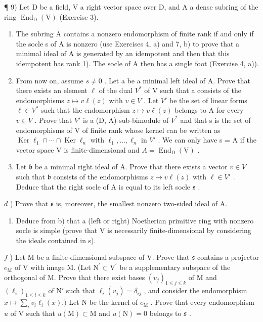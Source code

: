 ¶ 9) Let D be a field, V a right vector space over D, and A a dense subring of the ring \(\operatorname{End}_{\mathrm{D}}(\mathrm{V})\) (Exercise 3).

\begin{enumerate}
\def\labelenumi{\alph{enumi})}
\item
  The subring A contains a nonzero endomorphism of finite rank if and only if the socle s of A is nonzero (use Exercises 4, a) and 7, b) to prove that a minimal ideal of A is generated by an idempotent and then that this idempotent has rank 1). The socle of A then has a single foot (Exercise 4, a)).
\item
  From now on, assume \(s \neq 0\) . Let a be a minimal left ideal of A. Prove that there exists an element \(\ell\) of the dual \(V^{*}\) of V such that a consists of the endomorphisms \(z \mapsto v \ell(z)\) with \(v \in V\) . Let \(V'\) be the set of linear forms \(\ell \in V^{*}\) such that the endomorphism \(z \mapsto v \ell(z)\) belongs to A for every \(v \in V\) . Prove that \(V'\) is a (D, A)-sub-bimodule of \(V^{*}\) and that s is the set of endomorphisms of V of finite rank whose kernel can be written as \(\operatorname{Ker} \ell_{1} \cap \cdots \cap \operatorname{Ker} \ell_{n}\) with \(\ell_{1}, \ldots, \ell_{n}\) in \(V'\) . We can only have s = A if the vector space V is finite-dimensional and \(A = \operatorname{End}_{\mathrm{D}}(\mathrm{V})\) .
\item
  Let \(\mathfrak{b}\) be a minimal right ideal of A. Prove that there exists a vector \(v \in V\) such that \(\mathfrak{b}\) consists of the endomorphisms \(z \mapsto v\ell(z)\) with \(\ell \in V'\) . Deduce that the right socle of A is equal to its left socle \(\mathfrak{s}\) .
\end{enumerate}

\(d\) ) Prove that \(\mathfrak{s}\) is, moreover, the smallest nonzero two-sided ideal of A.

\begin{enumerate}
\def\labelenumi{\alph{enumi})}
\setcounter{enumi}{4}
\tightlist
\item
  Deduce from b) that a (left or right) Noetherian primitive ring with nonzero socle is simple (prove that V is necessarily finite-dimensional by considering the ideals contained in s).
\end{enumerate}

\(f\) ) Let M be a finite-dimensional subspace of V. Prove that \(\mathfrak{s}\) contains a projector \(e_{\mathrm{M}}\) of V with image M. (Let \(\mathrm{N}^{\prime}\subset \mathrm{V}^{\prime}\) be a supplementary subspace of the orthogonal of M. Prove that there exist bases \((v_{j})_{1\leqslant j\leqslant k}\) of M and \((\ell_i)_{1\leqslant i\leqslant k}\) of \(\mathrm{N}'\) such that \(\ell_i(v_j) = \delta_{ij}\) , and consider the endomorphism \(x\mapsto \sum_{i}v_{i}\ell_{i}(x).)\) Let N be the kernel of \(e_{\mathrm{M}}\) . Prove that every endomorphism \(u\) of V such that \(u(\mathrm{M})\subset \mathrm{M}\) and \(u(\mathrm{N}) = 0\) belongs to \(\mathfrak{s}\) .

